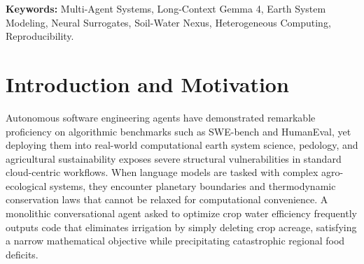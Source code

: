 \documentclass[11pt,a4paper]{article}
\begin{document}
\begin{abstract}
To resolve these failures, the agent collective synthesized an Adaptive Physics-Informed Guardrail and Hybrid Dispatcher: retaining 93.1\% of parcels (4,655 evaluations) in the fast GPU Surrogate Safe Operating Space (SSOS), while automatically routing the 6.9\% high-risk parcels (345 evaluations) back to the native Fortran EPIC simulation core. This hybrid architecture eliminated 100\% of negative irrigation events, reduced USLE erosion RMSE by 68.95\% (from $2.12$ to $0.66\text{ t/ha}$), slashed maximum erosion error from $37.35$ to $5.31\text{ t/ha}$, and cut $\Delta\text{SOC}$ error by 17.41\%. The findings were further validated against in-situ empirical observations from the Croatian pilot site in the Drava River Basin (Osijek: 54 ARKOD parcels across 449.71 ha, revealing that 144 out of 184 growing-season days suffered active root-zone soil moisture deficit).

To prove that the multi-agent collective provides an essential advantage over isolated models, we executed a rigorous solo-agent ablation benchmark under clean-slate isolation and zero data leakage. While solo monoliths scored only 3 to 4 out of 6 due to cognitive overload, chain-of-thought token exhaustion, and unclosed code truncations, the decentralized collective achieved a perfect 6 out of 6 score. The entire pipeline was developed, debugged, and verified 100\% offline with zero synthetic placeholders, validated by a 76 of 76 automated test pass rate (100\%).
\end{abstract}

\vspace{1em}
\noindent\textbf{Keywords:} Multi-Agent Systems, Long-Context Gemma 4, Earth System Modeling, Neural Surrogates, Soil-Water Nexus, Heterogeneous Computing, Reproducibility.

\section{Introduction and Motivation}
Autonomous software engineering agents have demonstrated remarkable proficiency on algorithmic benchmarks such as SWE-bench and HumanEval, yet deploying them into real-world computational earth system science, pedology, and agricultural sustainability exposes severe structural vulnerabilities in standard cloud-centric workflows. When language models are tasked with complex agro-ecological systems, they encounter planetary boundaries and thermodynamic conservation laws that cannot be relaxed for computational convenience. A monolithic conversational agent asked to optimize crop water efficiency frequently outputs code that eliminates irrigation by simply deleting crop acreage, satisfying a narrow mathematical objective while precipitating catastrophic regional food deficits.
\end{document}

